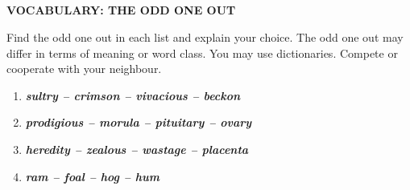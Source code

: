 \documentclass[10pt,a4paper,table]{article}
\begin{document}
\subsection{}
\textbf{VOCABULARY: THE ODD ONE OUT}

Find the odd one out in each list and explain your choice. The odd one out may differ in terms of meaning or word class. You may use dictionaries. Compete or cooperate with your neighbour.
\begin{enumerate}[label=\textbf{\alph*.},leftmargin=1.5em]
  \item \textbf{\textit{sultry -- crimson -- vivacious -- beckon}}
  \item \textbf{\textit{prodigious -- morula -- pituitary -- ovary}}
  \item \textbf{\textit{heredity -- zealous -- wastage -- placenta}}
  \item \textbf{\textit{ram -- foal -- hog -- hum}}
\end{enumerate}
\end{document}
